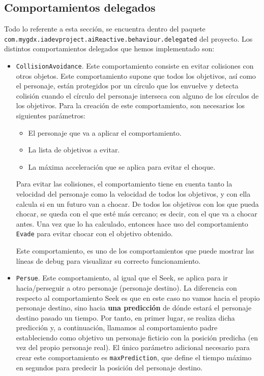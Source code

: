 \medskip
\subsection{Comportamientos delegados}
Todo lo referente a esta sección, se encuentra dentro del paquete \\ \texttt{com.mygdx.iadevproject.aiReactive.behaviour.delegated} del proyecto. Los distintos comportamientos delegados que hemos implementado son:
\begin{itemize}
 \item \texttt{CollisionAvoidance}. Este comportamiento consiste en evitar colisiones con otros objetos. Este comportamiento supone que todos los objetivos, así como el personaje, están protegidos por un círculo que los envuelve y detecta colisión cuando el círculo del personaje interseca con alguno de los círculos de los objetivos. Para la creación de este comportamiento, son necesarios los siguientes parámetros:
 \begin{itemize}
  \item El personaje que va a aplicar el comportamiento.
  \item La lista de objetivos a evitar.
  \item La máxima acceleración que se aplica para evitar el choque.
 \end{itemize}
 Para evitar las colisiones, el comportamiento tiene en cuenta tanto la velocidad del personaje como la velocidad de todos los objetivos, y con ella calcula si en un futuro van a chocar. De todos los objetivos con los que pueda chocar, se queda con el que esté más cercano; es decir, con el que va a chocar antes. Una vez que lo ha calculado, entonces hace uso del comportamiento \texttt{Evade} para evitar chocar con el objetivo obtenido. 
 
 Este comportamiento, es uno de los comportamientos que puede mostrar las líneas de debug para visualizar su correcto funcionamiento. 
 
 \item \texttt{Persue}. Este comportamiento, al igual que el Seek, se aplica para ir hacia/perseguir a otro personaje (personaje destino). La diferencia con respecto al comportamiento Seek es que en este caso no vamos hacia el propio personaje destino, sino hacia \textbf{una predicción} de dónde estará el personaje destino pasado un tiempo. Por tanto, en primer lugar, se realiza dicha predicción y, a continuación, llamamos al comportamiento padre estableciendo como objetivo un personaje ficticio con la posición predicha (en vez del propio personaje real). El único parámetro adicional necesario para crear este comportamiento es \texttt{maxPrediction}, que define el tiempo máximo en segundos para predecir la posición del personaje destino.
  

\end{itemize}
